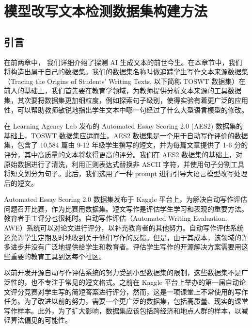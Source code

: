 

\chapter{模型改写文本检测数据集构建方法}
\label{chap:TOSWT}

\section{引言}
\label{sec:TOSWT-intro}

在前两章中， 我们详细介绍了探测 AI 生成文本的前世今生。在本章节中，我们将构造出属于自己的数据集。我们的数据集名称叫做追踪学生写作文本来源数据集（Tracing the Origins of Students’ Writing Texts, 以下简称 TOSWT 数据集）在前人的基础上，我们首先要在教育学领域，为教师提供分析文本来源的工具数据集，其次要将数据集更加细粒度，例如探索句子级别，使得实验有着更广泛的应用性，可以帮助教师敏锐地指出学生文本中哪一句经过了什么大型语言模型的修改。

在 Learning Agency Lab 发布的 Automated Essay Scoring 2.0 \cite{learning-agency-lab-automated-essay-scoring-2} (AES2) 数据集的基础上，TOSWT 数据集应运而生。AES2 数据集是一个用于自动写作评价的数据集，包含了 10,584 篇由 9-12 年级学生撰写的短文，并为每篇文章提供了 1-6 分的评分，其中高质量的文本将获得更高的评分。我们在 AES2 数据集的基础上，对原始数据进行了清洗，利用正则表达式替换非 ASCII 字符，并使用句子分割工具将短文划分为句子。此后，我们选用了一种 prompt 进行引导大语言模型改写处理后的短文。

Automated Essay Scoring 2.0 数据集发布于 Kaggle 平台上，为解决自动写作评估问题召开比赛，作为比赛用数据集。短文写作是评估学生学习和表现的重要方法。教育者手工评分也很耗时。自动写作评估（Automated Writing Evaluation, AWE）系统可以对论文进行评分，以补充教育者的其他努力。自动写作评估系统还允许学生定期及时地收到关于他们写作的反馈。但是，由于其成本，该领域的许多进步并没有广泛地提供给学生和教育者。评估学生写作的开源解决方案需要用这些重要的教育工具到达每个社区。

以前开发开源自动写作评估系统的努力受到小型数据集的限制，这些数据集不是广泛性的，也不专注于常见的短文格式。之前在 Kaggle 平台上举办的第一届自动论文评分竞赛对学生写的简短答案进行评分，然而，这是一项课堂上不常使用的写作任务。为了改进以前的努力，需要一个更广泛的数据集，包括高质量、现实的课堂写作样本。此外，为了扩大影响，数据集应该包括跨经济和地点人群的样本，以减轻算法偏见的可能性。


